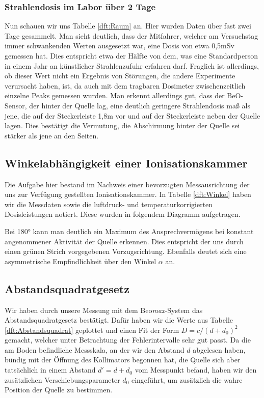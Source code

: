 \subsubsection{Strahlendosis im Labor über 2 Tage}
Nun schauen wir uns Tabelle \ref{dft:Raum} an. Hier wurden Daten über fast zwei Tage gesammelt. Man sieht 
deutlich, dass der Mitfahrer, welcher am Versuchstag immer schwankenden Werten ausgesetzt war, eine Dosis von 
etwa 0,5mSv gemessen hat. Dies entspricht etwa der Hälfte von dem, was eine Standardperson in einem Jahr an 
künstlicher Strahlenzufuhr erfahren darf. Fraglich ist allerdings, ob dieser Wert nicht ein Ergebnis von Störungen, 
die andere Experimente verursacht haben, ist, da auch mit dem tragbaren Dosimeter zwischenzeitlich einzelne Peaks gemessen wurden.
Man erkennt allerdings gut, dass der BeO-Sensor, der hinter der Quelle lag, eine deutlich geringere Strahlendosis maß als jene, die auf der Steckerleiste 1,8m vor und auf der Steckerleiste neben der Quelle lagen. Dies bestätigt die Vermutung, die Abschirmung hinter der Quelle sei stärker als jene an den Seiten.

\subsection{Winkelabhängigkeit einer Ionisationskammer}
    Die Aufgabe hier bestand im Nachweis einer bevorzugten Messausrichtung der uns zur Verfügung gestellten Ionisationskammer. In Tabelle \ref{dft:Winkel} haben wir die Messdaten sowie die luftdruck- und temperaturkorrigierten Dosisleistungen notiert.
    Diese wurden in folgendem Diagramm aufgetragen.

    \begin{center}
        \minipanf
                \makebox[\textwidth]{} %
                \label{auswd:Winkel}
        \minipend
    \end{center}
    \vspace{3mm}
    Bei 180° kann man deutlich ein Maximum des Ansprechvermögens bei konstant angenommener Aktivität der Quelle erkennen. Dies entspricht der uns durch einen grünen Strich vorgegebenen Vorzugsrichtung. Ebenfalls deutet sich eine asymmetrische Empfindlichkeit über den Winkel $\alpha$ an. 


\subsection{Abstandsquadratgesetz}
Wir haben durch unsere Messung mit dem Beo\textit{max}-System das Abstandsquadratgesetz bestätigt. Dafür haben wir die Werte aus Tabelle \ref{dft:Abstandsquadrat} geplottet und einen Fit der Form $\dot{D} = c/(d+d_0)^2$ gemacht, welcher unter Betrachtung der Fehlerintervalle sehr gut passt. Da die am Boden befindliche Messskala, an der wir den Abstand $d$ abgelesen haben, bündig mit der Öffnung des Kollimators begonnen hat, die Quelle sich aber tatsächlich in einem Abstand $d' = d + d_0$ vom Messpunkt befand, haben wir den zusätzlichen Verschiebungsparameter $d_0$ eingeführt, um zusätzlich die wahre Position der Quelle zu bestimmen.

